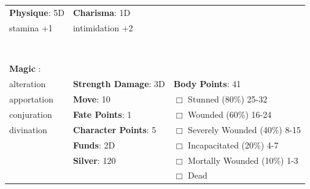 \documentclass[10pt]{article}
\begin{document}
\begin{table}
\begin{tabular}{m{156pt} m{156pt} m{156pt}}
\textbf{Physique}: 5D \hrulefill & \textbf{Charisma}: 1D \hrulefill     &  \hrulefill \\

stamina           +1 \hrulefill & intimidation      +2 \hrulefill &  \hrulefill \\

 \hrulefill &  \hrulefill &  \hrulefill \\

 \hrulefill &  \hrulefill &  \hrulefill \\

 \hrulefill &  \hrulefill &  \hrulefill \\

 \hrulefill &  \hrulefill &  \hrulefill \\

 \hrulefill &  \hrulefill &  \hrulefill \\

 \hrulefill &  \hrulefill &  \hrulefill \\

 \hrulefill &  \hrulefill &  \hrulefill \\

                                  &                                 &                             \\
\textbf{Magic }:  \hrulefill  &                                 &                             \\
alteration           \hrulefill & \textbf{Strength Damage}: 3D \hrulefill                             & \textbf{Body Points}: 41 \hrulefill \\
apportation          \hrulefill                        & \textbf{Move}:             10             \hrulefill    & $\Box$ Stunned \footnotesize{(80\%)} \hfill 25-32 \\
conjuration          \hrulefill                        & \textbf{Fate Points}:      1      \hrulefill    & $\Box$ Wounded \footnotesize{(60\%)} \hfill 16-24 \\
divination           \hrulefill                        & \textbf{Character Points}: 5 \hrulefill    & $\Box$ Severely Wounded \footnotesize{(40\%)} \hfill 8-15 \\
 \hrulefill                        & \textbf{Funds}:            2D            \hrulefill    & $\Box$ Incapacitated \footnotesize{(20\%)} \hfill 4-7 \\
 \hrulefill                        & \textbf{Silver}:           120           \hrulefill    & $\Box$ Mortally Wounded \footnotesize{(10\%)} \hfill 1-3 \\
 \hrulefill                        &  \hrulefill                                                       & $\Box$ Dead   \\
\end{tabular}
\end{table}
\cleardoublepage
\end{document}
